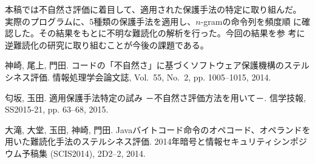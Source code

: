 \documentclass[a4j,fleqn,10pt]{jarticle}
\begin{document}

本稿では不自然さ評価に着目して、適用された保護手法の特定に取り組んだ。
実際のプログラムに、5種類の保護手法を適用し、$n$-gramの命令列を頻度順
に確認した。その結果をもとに不明な難読化の解析を行った。今回の結果を参
考に逆難読化の研究に取り組むことが今後の課題である。

\begin{thebibliography}{1}

神崎, 尾上, 門田.
\newblock コードの「不自然さ」に基づくソフトウェア保護機構のステルシネス評価.
\newblock 情報処理学会論文誌, Vol.~55, No.~2, pp. 1005--1015, 2014.

匂坂, 玉田.
\newblock 適用保護手法特定の試み －不自然さ評価方法を用いて－.
\newblock  信学技報, SS2015-21, pp. 63--68, 2015.

大滝, 大堂, 玉田, 神崎, 門田.
\newblock
  Javaバイトコード命令のオペコード、オペランドを用いた難読化手法のステルシネス評価.
\newblock  2014年暗号と情報セキュリティシンポジウム予稿集 (SCIS2014), 
  2D2--2, 2014.

\end{thebibliography}
\end{document}
